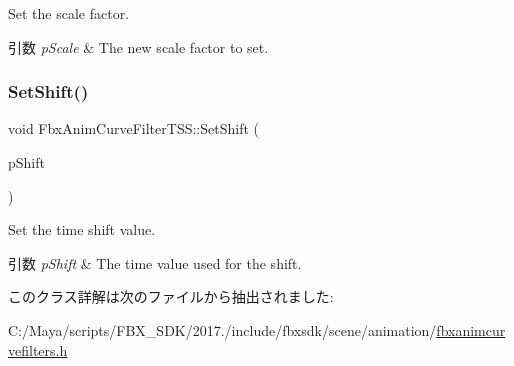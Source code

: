 Set the scale factor. 
\begin{DoxyParams}{引数}
{\em p\+Scale} & The new scale factor to set. \\
\hline
\end{DoxyParams}
\mbox{\label{class_fbx_anim_curve_filter_t_s_s_a7f8c6250190a961284e894e977b4233f}} 
\subsubsection{\texorpdfstring{Set\+Shift()}{SetShift()}}
{\footnotesize\ttfamily void Fbx\+Anim\+Curve\+Filter\+T\+S\+S\+::\+Set\+Shift (\begin{DoxyParamCaption}\item[{\hyperlink{class_fbx_time}{Fbx\+Time} \&}]{p\+Shift }\end{DoxyParamCaption})}

Set the time shift value. 
\begin{DoxyParams}{引数}
{\em p\+Shift} & The time value used for the shift. \\
\hline
\end{DoxyParams}


このクラス詳解は次のファイルから抽出されました\+:\begin{DoxyCompactItemize}
\item 
C\+:/\+Maya/scripts/\+F\+B\+X\+\_\+\+S\+D\+K/2017./include/fbxsdk/scene/animation/\hyperlink{fbxanimcurvefilters_8h}{fbxanimcurvefilters.\+h}\end{DoxyCompactItemize}
